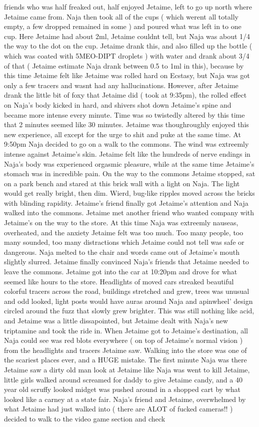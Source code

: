 \documentclass[12pt]{book}
\begin{document}
friends who was half freaked out, half enjoyed Jetaime, left to go up north where Jetaime came from. Naja then took all of the cups ( which werent all totally empty, a few dropped remained in some ) and poured what was left in to one cup. Here Jetaime had about 2ml, Jetaime couldnt tell, but Naja was about 1/4 the way to the dot on the cup. Jetaime drank this, and also filled up the bottle ( which was coated with 5MEO-DIPT droplets ) with water and drank about 3/4 of that ( Jetaime estimate Naja drank between 0.5 to 1ml in this), because by this time Jetaime felt like Jetaime was rolled hard on Ecstasy, but Naja was got only a few tracers and wasnt had any hallucinations. However, after Jetaime drank the little bit of foxy that Jetaime did ( took at 9:35pm), the rolled effect on Naja's body kicked in hard, and shivers shot down Jetaime's spine and became more intense every minute. Time was so twistedly altered by this time that 2 minutes seemed like 30 minutes. Jetaime was thoughroughly enjoyed this new experience, all except for the urge to shit and puke at the same time. At 9:50pm Naja decided to go on a walk to the commons. The wind was extreemly intense against Jetaime's skin. Jetaime felt like the hundreds of nerve endings in Naja's body was experienced orgasmic pleasure, while at the same time Jetaime's stomach was in incredible pain. On the way to the commons Jetaime stopped, sat on a park bench and stared at this brick wall with a light on Naja. The light would get really bright, then dim. Wierd, bug-like ripples moved across the bricks with blinding rapidity. Jetaime's friend finally got Jetaime's attention and Naja walked into the commons. Jetaime met another friend who wanted company with Jetaime's on the way to the store. At this time Naja was extreemly nauseas, overheated, and the anxiety Jetaime felt was too much. Too many people, too many sounded, too many distractions which Jetaime could not tell was safe or dangerous. Naja melted to the chair and words came out of Jetaime's mouth slightly slurred. Jetaime finally convinced Naja's friends that Jetaime needed to leave the commons. Jetaime got into the car at 10:20pm and drove for what seemed like hours to the store. Headlights of moved cars streaked beautiful colorful tracers across the road, buildings stretched and grew, trees was unusual and odd looked, light posts would have auras around Naja and apinwheel' design circled around the fuzz that slowly grew brighter. This was still nothing like acid, and Jetaime was a little dissapointed, but Jetaime dealt with Naja's new triptamine and took the ride in. When Jetaime got to Jetaime's destination, all Naja could see was red blots everywhere ( on top of Jetaime's normal vision ) from the headlights and tracers Jetaime saw. Walking into the store was one of the scariest places ever, and a HUGE mistake. The first minute Naja was there Jetaime saw a dirty old man look at Jetaime like Naja was went to kill Jetaime, little girls walked around screamed for daddy to give Jetaime candy, and a 40 year old scruffy looked midget was pushed around in a shopped cart by what looked like a carney at a state fair. Naja's friend and Jetaime, overwhelmed by what Jetaime had just walked into ( there are ALOT of fucked cameras!! ) decided to walk to the video game section and check 
\end{document}

